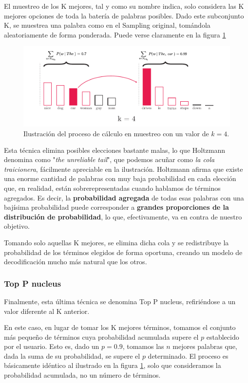 El muestreo de los K mejores, tal y como su nombre indica, solo considera las K mejores opciones de toda la batería de palabras posibles. Dado este subconjunto K, se muestrea una palabra como en el Sampling original, tomándola aleatoriamente de forma ponderada. Puede verse claramente en la figura \ref{fig:top-k} 


\begin{figure}[h]
	\centering
	\includegraphics[width=.9\textwidth]{media/top k.pdf}
	\caption{Ilustración del proceso de cálculo en muestreo con un valor de $k = 4$.}
	\label{fig:top-k}
\end{figure}

Esta técnica elimina posibles elecciones bastante malas, lo que Holtzmann denomina como "\textit{the unreliable tail}", que podemos acuñar como \textit{la cola traicionera}, fácilmente apreciable en la ilustración. Holtzmann afirma que existe una enorme cantidad de palabras con muy baja probabilidad en cada elección que, en realidad, están sobrerepresentadas cuando hablamos de términos agregados. Es decir, la \textbf{probabilidad agregada} de todas esas palabras con una bajísima probabilidad puede corresponder a \textbf{grandes proporciones de la distribución de probabilidad}, lo que, efectivamente, va en contra de nuestro objetivo.

Tomando solo aquellas K mejores, se elimina dicha cola y se redistribuye la probabilidad de los términos elegidos de forma oportuna, creando un modelo de decodificación mucho más natural que los otros.

\subsubsection{Top P nucleus}

Finalmente, esta última técnica se denomina Top P nucleus, refiriéndose a un valor diferente al K anterior.

En este caso, en lugar de tomar los K mejores términos, tomamos el conjunto más pequeño de términos cuya probabilidad acumulada supere el $p$ establecido por el usuario. Esto es, dado un $p = 0.9$, tomamos las $n$ mejores palabras que, dada la suma de su probabilidad, se supere el $p$ determinado. El proceso es básicamente idéntico al ilustrado en la figura \ref{fig:top-k}, solo que consideramos la probabilidad acumulada, no un número de términos.

